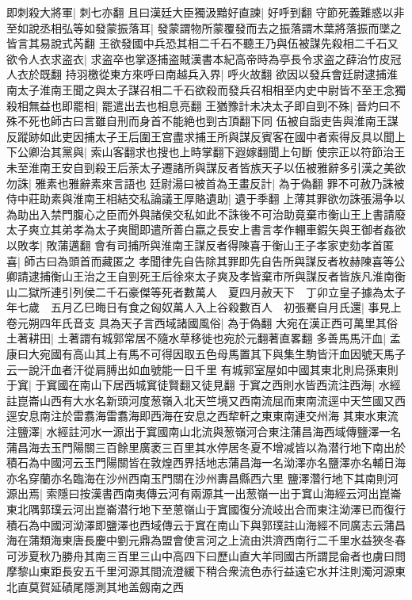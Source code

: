 即刺殺大將軍|{
	刺七亦翻}
且曰漢廷大臣獨汲黯好直諫|{
	好呼到翻}
守節死義難惑以非至如說丞相弘等如發蒙振落耳|{
	發蒙謂物所蒙覆發而去之振落謂木葉將落振而墜之皆言其易說式芮翻}
王欲發國中兵恐其相二千石不聽王乃與伍被謀先殺相二千石又欲令人衣求盗衣|{
	求盗卒也掌逐捕盗賊漢書本紀高帝時為亭長令求盗之薛治竹皮冠人衣於既翻}
持羽檄從東方來呼曰南越兵入界|{
	呼火故翻}
欲因以發兵會廷尉逮捕淮南太子淮南王聞之與太子謀召相二千石欲殺而發兵召相相至内史中尉皆不至王念獨殺相無益也即罷相|{
	罷遣出去也相息亮翻}
王猶豫計未决太子即自剄不殊|{
	晉灼曰不殊不死也師古曰言雖自刑而身首不能絶也剄古頂翻下同}
伍被自詣吏告與淮南王謀反蹤跡如此吏因捕太子王后圍王宫盡求捕王所與謀反賓客在國中者索得反具以聞上下公卿治其黨與|{
	索山客翻求也搜也上時掌翻下遐嫁翻聞上句斷}
使宗正以符節治王未至淮南王安自剄殺王后荼太子遷諸所與謀反者皆族天子以伍被雅辭多引漢之美欲勿誅|{
	雅素也雅辭素來言語也}
廷尉湯曰被首為王畫反計|{
	為于偽翻}
罪不可赦乃誅被侍中莊助素與淮南王相結交私論議王厚賂遺助|{
	遺于季翻}
上薄其罪欲勿誅張湯争以為助出入禁門腹心之臣而外與諸侯交私如此不誅後不可治助竟棄市衡山王上書請廢太子爽立其弟孝為太子爽聞即遣所善白嬴之長安上書言孝作輣車鍜矢與王御者姦欲以敗孝|{
	敗蒲邁翻}
會有司捕所與淮南王謀反者得陳喜于衡山王子孝家吏劾孝首匿喜|{
	師古曰為頭首而藏匿之}
孝聞律先自告除其罪即先自告所與謀反者枚赫陳喜等公卿請逮捕衡山王治之王自剄死王后徐來太子爽及孝皆棄市所與謀反者皆族凡淮南衡山二獄所連引列侯二千石豪傑等死者數萬人　夏四月赦天下　丁卯立皇子據為太子年七歲　五月乙巳晦日有食之匈奴萬人入上谷殺數百人　初張騫自月氏還|{
	事見上卷元朔四年氏音支}
具為天子言西域諸國風俗|{
	為于偽翻}
大宛在漢正西可萬里其俗土著耕田|{
	土著謂有城郭常居不隨水草移徙也宛於元翻著直畧翻}
多善馬馬汗血|{
	孟康曰大宛國有高山其上有馬不可得因取五色母馬置其下與集生駒皆汗血因號天馬子云一說汗血者汗從肩膊出如血號能一日千里}
有城郭室屋如中國其東北則烏孫東則于窴|{
	于窴國在南山下居西城窴徒賢翻又徒見翻}
于窴之西則水皆西流注西海|{
	水經註崑崙山西有大水名新頭河度葱嶺入北天竺境又西南流屈而東南流逕中天竺國又西逕安息南注於雷翥海雷翥海即西海在安息之西犂軒之東東南連交州海}
其東水東流注鹽澤|{
	水經註河水一源出于窴國南山北流與葱嶺河合東注蒲昌海西域傳鹽澤一名蒲昌海去玉門陽關三百餘里廣袤三百里其水停居冬夏不增减皆以為潜行地下南出於積石為中國河云玉門陽關皆在敦煌西界括地志蒲昌海一名泑澤亦名鹽澤亦名輔日海亦名穿蘭亦名臨海在沙州西南玉門關在沙州夀昌縣西六里}
鹽澤濳行地下其南則河源出焉|{
	索隱曰按漢書西南夷傳云河有兩源其一出葱嶺一出于窴山海經云河出崑崙東北隅郭璞云河出崑崙潜行地下至蒽嶺山于窴國復分流岐出合而東注泑澤已而復行積石為中國河泑澤即鹽澤也西域傳云于窴在南山下與郭璞註山海經不同廣志云蒲昌海在蒲類海東唐長慶中劉元鼎為盟會使言河之上流由洪濟西南行二千里水益狹冬春可涉夏秋乃勝舟其南三百里三山中高四下曰歷山直大羊同國古所謂昆侖者也虜曰問摩黎山東距長安五千里河源其間流澄緩下稍合衆流色赤行益遠它水并注則濁河源東北直莫賀延磧尾隱測其地盖劔南之西}
